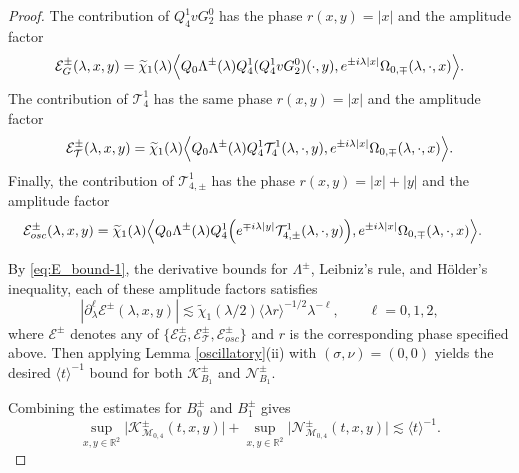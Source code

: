 \documentclass[10pt,a4paper]{amsart}
\begin{document}
\begin{proof}
	The contribution of $Q_4^1vG_2^0$ has the phase
	$
	r(x,y)=|x|
	$
	and the amplitude factor
	\begin{equation*}
		\mathcal{E}_{G}^\pm(\lambda,x,y)
		=
		\widetilde{\chi}_1(\lambda)
		\Bigl\langle
		Q_0\Lambda^\pm(\lambda)Q_4^1
	(Q_4^1vG_2^0)(\cdot,y),
		e^{\pm i\lambda|x|}
		\Omega_{0,\mp}(\lambda,\cdot,x)
		\Bigr\rangle.
	\end{equation*}
	The contribution of $\mathcal{T}_4^1$ has the same phase
	$r(x,y)=|x|$ and  the amplitude factor
	\begin{equation*}
		\mathcal{E}_{\mathcal{T}}^\pm(\lambda,x,y)
		=
		\widetilde{\chi}_1(\lambda)
		\Bigl\langle
		Q_0\Lambda^\pm(\lambda)Q_4^1
		\mathcal{T}_4^1(\lambda,\cdot,y),
		e^{\pm i\lambda|x|}
		\Omega_{0,\mp}(\lambda,\cdot,x)
		\Bigr\rangle.
	\end{equation*}
	Finally, the contribution of $\mathcal{T}_{4,\pm}^1$ has the  phase
	$
	r(x,y)=|x|+|y|
	$
	and the  amplitude factor
	\begin{align*}
		\mathcal{E}_{osc}^\pm(\lambda,x,y)
		={}&
		\widetilde{\chi}_1(\lambda)
		\Bigl\langle
		Q_0\Lambda^\pm(\lambda)Q_4^1
		\Bigl(
		e^{\mp i\lambda|y|}
		\mathcal{T}_{4,\pm}^1(\lambda,\cdot,y)
		\Bigr),
		e^{\pm i\lambda|x|}
		\Omega_{0,\mp}(\lambda,\cdot,x)
		\Bigr\rangle.
	\end{align*}
	
	By \eqref{eq:E_bound-1}, the derivative
	bounds for $\Lambda^\pm$, Leibniz's rule, and H\"older's inequality, each of these amplitude factors satisfies
	\begin{equation*}
		\left|
		\partial_\lambda^\ell
		\mathcal{E}^\pm(\lambda,x,y)
		\right|
		\lesssim
		\widetilde{\chi}_1(\lambda/2)
		\langle\lambda r\rangle^{-1/2}
		\lambda^{-\ell},
		\qquad
		\ell=0,1,2,
	\end{equation*}
	where $\mathcal{E}^\pm$ denotes any of
	$\{
	\mathcal{E}_{G}^\pm,
	\mathcal{E}_{\mathcal{T}}^\pm,
	\mathcal{E}_{osc}^\pm\}
	$
	and $r$ is the corresponding phase specified above. Then applying Lemma
	\ref{oscillatory}(ii) with $(\sigma,\nu)=(0,0)$ yields  the desired $\langle t\rangle^{-1}$ bound for both
	$\mathcal{K}_{B_1}^\pm$ and $\mathcal{N}_{B_1}^\pm$.
	
	Combining the estimates for $B_0^\pm$ and $B_1^\pm$ gives
	$$
	\sup_{x,y\in \mathbb{R}^2}
	\bigl|
	\mathcal{K}_{\mathcal{M}_{0,4}}^\pm(t,x,y)
	\bigr|
	+
	\sup_{x,y\in \mathbb{R}^2}
	\bigl|
	\mathcal{N}_{\mathcal{M}_{0,4}}^\pm(t,x,y)
	\bigr|
	\lesssim
	\langle t\rangle^{-1}.
	$$


\end{proof}
\end{document}

